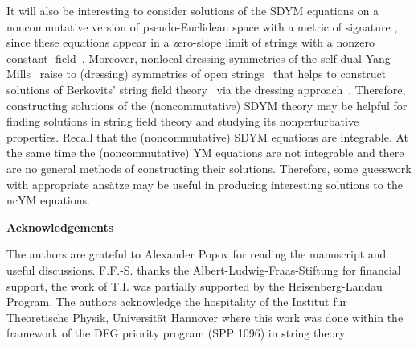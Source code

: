 \documentclass[a4paper,11pt]{article}
\numberwithin{equation}{section}
\begin{document}
It will also be interesting to consider solutions of the SDYM equations 
on a noncommutative version of pseudo-Euclidean space with a metric of signature
\coordHE{}, since these equations appear in a zero-slope limit of \coordHE{} strings
 with a nonzero constant \coordHE{}-field~\cite{Le:2000nm}. Moreover,
nonlocal dressing symmetries of the self-dual Yang-Mills~\cite{6}
raise to (dressing) symmetries of open \coordHE{} strings~\cite{5} 
that helps to construct solutions of Berkovits' string field theory~\cite{Berkovits:1995ab}
via the dressing approach~\cite{LPU}. Therefore,
constructing solutions of the (noncommutative) SDYM theory may be helpful for
finding solutions in string field theory and studying its nonperturbative properties. 
Recall that the (noncommutative) SDYM equations are integrable. At the same time
 the (noncommutative) YM equations are not integrable and  there are no general methods
of constructing their solutions. Therefore, some guesswork with  appropriate
ans\"atze may be useful in producing interesting solutions to the ncYM equations.

\bigskip

\noindent
{\large{\bf Acknowledgements}}

\smallskip
\noindent
The authors are grateful to Alexander Popov for reading  the manuscript 
and useful discussions. F.F.-S. thanks the Albert-Ludwig-Fraas-Stiftung for 
financial support, 
the work of T.I. was partially supported by the Heisenberg-Landau Program.
The authors acknowledge the hospitality of the Institut f\"ur Theoretische Physik, 
Universit\"at Hannover where this work was done within the framework 
of the DFG priority program (SPP 1096) in string theory.

\newpage
\end{document}

